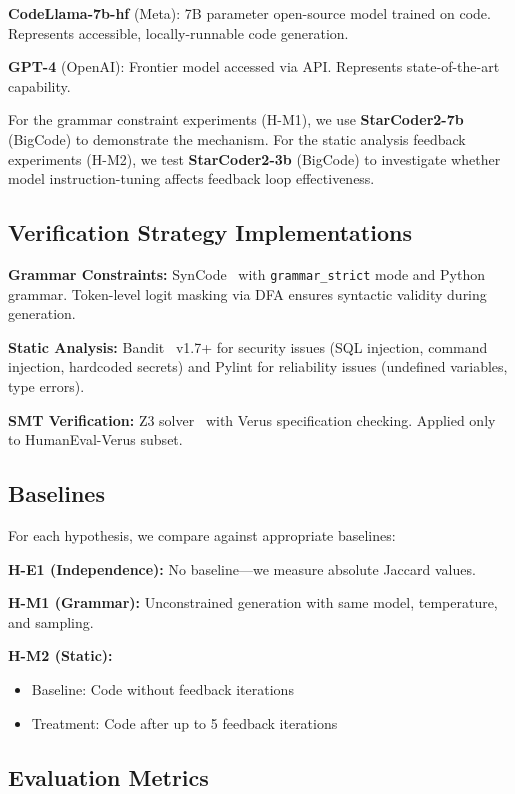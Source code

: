 \textbf{CodeLlama-7b-hf} (Meta): 7B parameter open-source model trained on code. Represents accessible, locally-runnable code generation.

\textbf{GPT-4} (OpenAI): Frontier model accessed via API. Represents state-of-the-art capability.

For the grammar constraint experiments (H-M1), we use \textbf{StarCoder2-7b}~\cite{starcoder2_2024} (BigCode) to demonstrate the mechanism. For the static analysis feedback experiments (H-M2), we test \textbf{StarCoder2-3b} (BigCode) to investigate whether model instruction-tuning affects feedback loop effectiveness.

\subsection{Verification Strategy Implementations}

\textbf{Grammar Constraints:} SynCode~\cite{syncode2024} with \texttt{grammar\_strict} mode and Python grammar. Token-level logit masking via DFA ensures syntactic validity during generation.

\textbf{Static Analysis:} Bandit~\cite{bandit2024} v1.7+ for security issues (SQL injection, command injection, hardcoded secrets) and Pylint for reliability issues (undefined variables, type errors).

\textbf{SMT Verification:} Z3 solver~\cite{z3solver} with Verus specification checking. Applied only to HumanEval-Verus subset.

\subsection{Baselines}

For each hypothesis, we compare against appropriate baselines:

\textbf{H-E1 (Independence):} No baseline---we measure absolute Jaccard values.

\textbf{H-M1 (Grammar):} Unconstrained generation with same model, temperature, and sampling.

\textbf{H-M2 (Static):}
\begin{itemize}
    \item Baseline: Code without feedback iterations
    \item Treatment: Code after up to 5 feedback iterations
\end{itemize}

\subsection{Evaluation Metrics}

